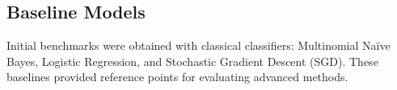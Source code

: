 \subsection{Baseline Models}  %
Initial benchmarks were obtained with classical classifiers:
Multinomial Naïve Bayes, Logistic Regression, and Stochastic Gradient Descent
(SGD). These baselines provided reference points for evaluating advanced
methods.